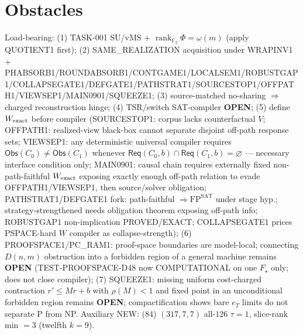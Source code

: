 \documentclass[11pt]{article}
\begin{document}
\section*{Obstacles}
Load-bearing: (1) TASK-001 SU/vMS + $\operatorname{rank}_{\mathbb F_2}\Phi=\omega(m)$ (apply QUOTIENT1 first);
(2) SAME\_REALIZATION acquisition under WRAPINV1 + PHABSORB1/ROUNDABSORB1/CONTGAME1/LOCALSEM1/ROBUSTGAP1/COLLAPSEGATE1/DEFGATE1/PATHSTRAT1/SOURCESTOP1/OFFPATH1/VIEWSEP1/MAIN0901/SQUEEZE1;
(3) source-matched no-sharing $\Rightarrow$ charged reconstruction hinge;
(4) TSR/switch SAT-compiler \textbf{OPEN};
(5) define $W_{\rm exact}$ before compiler (SOURCESTOP1: corpus lacks counterfactual $V$;
OFFPATH1: realized-view black-box cannot separate disjoint off-path response sets;
VIEWSEP1: any deterministic universal compiler requires $\mathsf{Obs}(C_0)\ne\mathsf{Obs}(C_1)$
whenever $\mathsf{Req}(C_0,b)\cap\mathsf{Req}(C_1,b)=\varnothing$ --- necessary interface condition only;
MAIN0901: causal chain requires externally fixed non-path-faithful $W_{\rm exact}$ exposing
exactly enough off-path relation to evade OFFPATH1/VIEWSEP1, then source/solver obligation;
PATHSTRAT1/DEFGATE1 fork: path-faithful $\Rightarrow\mathrm{FP}^{\mathrm{SAT}}$ under stage hyp.;
strategy-strengthened needs obligation theorem exposing off-path info;
ROBUSTGAP1 non-implication PROVED/EXACT; COLLAPSEGATE1 prices PSPACE-hard $W$ compiler as collapse-strength);
(6) PROOFSPACE1/PC\_RAM1: proof-space boundaries are model-local; connecting $D(n,m)$ obstruction into a
forbidden region of a general machine remains \textbf{OPEN} (TEST-PROOFSPACE-D48 now COMPUTATIONAL on one $F_\star$ only; does not close compiler);
(7) SQUEEZE1: missing uniform cost-charged contraction $r'\le Mr+b$ with $\rho(M)<1$ and fixed point in an unconditional forbidden region remains \textbf{OPEN}; compactification shows bare $e_T$ limits do not separate P from NP.
Auxiliary NEW: (84) $(317,7,7)$ all-$126$ $\tau{=}1$, slice-rank min $=3$ (twelfth $k{=}9$).
\end{document}
